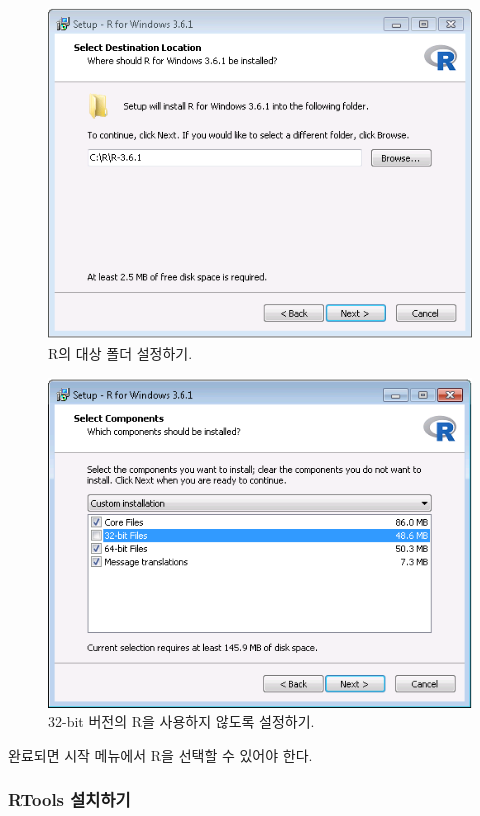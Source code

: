 \documentclass[10.5pt]{book}
\theoremstyle{definition}
\theoremstyle{definition}
\theoremstyle{definition}
\theoremstyle{remark}
\begin{document}
\begin{figure}

{\centering \includegraphics[width=0.8\linewidth]{images/OhdsiAnalyticsTools/rDestination} 

}

\caption{R의 대상 폴더 설정하기.}\label{fig:rDestination}
\end{figure}

\begin{figure}

{\centering \includegraphics[width=0.8\linewidth]{images/OhdsiAnalyticsTools/no32Bits} 

}

\caption{32-bit 버전의 R을 사용하지 않도록 설정하기.}\label{fig:no32Bits}
\end{figure}

완료되면 시작 메뉴에서 R을 선택할 수 있어야 한다.

\subsubsection*{RTools 설치하기}\label{rtools-}
\end{document}
